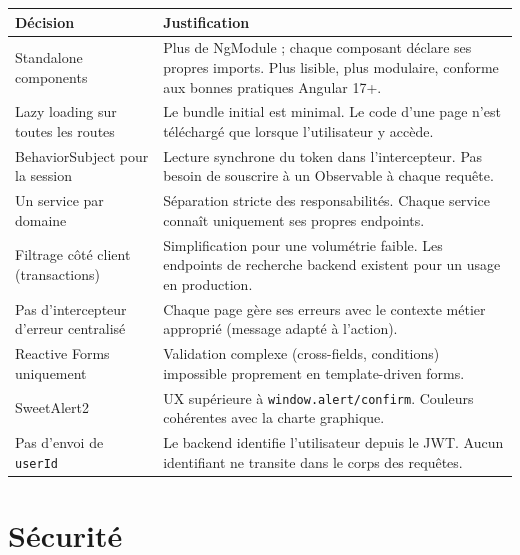\documentclass[12pt,a4paper]{article}
\begin{document}
\begin{center}
\begin{tabularx}{\linewidth}{L{5cm} X}
\toprule
\textbf{Décision} & \textbf{Justification} \\
\midrule
Standalone components & Plus de NgModule ; chaque composant déclare ses propres
                        imports. Plus lisible, plus modulaire, conforme aux bonnes
                        pratiques Angular 17+. \\
\midrule
Lazy loading sur toutes les routes & Le bundle initial est minimal. Le code d'une
                                     page n'est téléchargé que lorsque l'utilisateur
                                     y accède. \\
\midrule
BehaviorSubject pour la session & Lecture synchrone du token dans l'intercepteur.
                                   Pas besoin de souscrire à un Observable à chaque
                                   requête. \\
\midrule
Un service par domaine & Séparation stricte des responsabilités. Chaque service
                          connaît uniquement ses propres endpoints. \\
\midrule
Filtrage côté client (transactions) & Simplification pour une volumétrie faible.
                                       Les endpoints de recherche backend existent
                                       pour un usage en production. \\
\midrule
Pas d'intercepteur d'erreur centralisé & Chaque page gère ses erreurs avec le contexte
                                          métier approprié (message adapté à l'action). \\
\midrule
Reactive Forms uniquement & Validation complexe (cross-fields, conditions) impossible
                            proprement en template-driven forms. \\
\midrule
SweetAlert2 & UX supérieure à \texttt{window.alert/confirm}. Couleurs cohérentes
              avec la charte graphique. \\
\midrule
Pas d'envoi de \texttt{userId} & Le backend identifie l'utilisateur depuis le JWT.
                                  Aucun identifiant ne transite dans le corps des requêtes. \\
\bottomrule
\end{tabularx}
\end{center}

\section{Sécurité}
\end{document}
